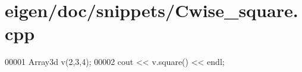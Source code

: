 \hypertarget{eigen_2doc_2snippets_2_cwise__square_8cpp_source}{}\section{eigen/doc/snippets/\+Cwise\+\_\+square.cpp}
\label{eigen_2doc_2snippets_2_cwise__square_8cpp_source}

\begin{DoxyCode}
00001 Array3d v(2,3,4);
00002 cout << v.square() << endl;
\end{DoxyCode}
